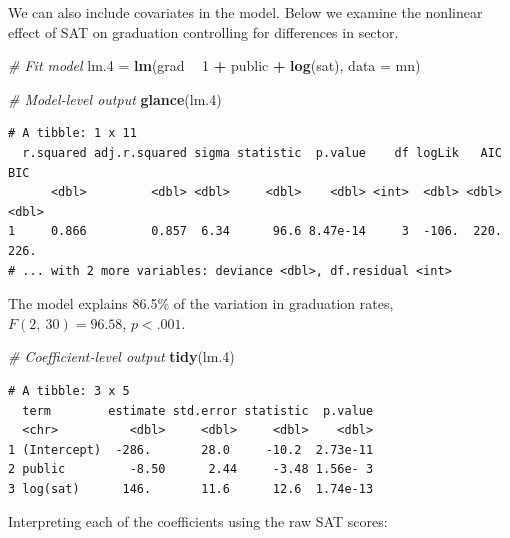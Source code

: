 \documentclass[]{book}
\newenvironment{Shaded}{\begin{snugshade}}{\end{snugshade}}
\newcommand{\CommentTok}[1]{\textcolor[rgb]{0.56,0.35,0.01}{\textit{#1}}}
\newcommand{\DataTypeTok}[1]{\textcolor[rgb]{0.13,0.29,0.53}{#1}}
\newcommand{\DecValTok}[1]{\textcolor[rgb]{0.00,0.00,0.81}{#1}}
\newcommand{\FloatTok}[1]{\textcolor[rgb]{0.00,0.00,0.81}{#1}}
\newcommand{\KeywordTok}[1]{\textcolor[rgb]{0.13,0.29,0.53}{\textbf{#1}}}
\newcommand{\NormalTok}[1]{#1}
\newcommand{\OperatorTok}[1]{\textcolor[rgb]{0.81,0.36,0.00}{\textbf{#1}}}
\newcommand{\StringTok}[1]{\textcolor[rgb]{0.31,0.60,0.02}{#1}}
\begin{document}
We can also include covariates in the model. Below we examine the nonlinear effect of SAT on graduation controlling for differences in sector.

\begin{Shaded}
\begin{Highlighting}[]
\CommentTok{# Fit model}
\NormalTok{lm}\FloatTok{.4}\NormalTok{ =}\StringTok{ }\KeywordTok{lm}\NormalTok{(grad }\OperatorTok{~}\StringTok{ }\DecValTok{1} \OperatorTok{+}\StringTok{ }\NormalTok{public }\OperatorTok{+}\StringTok{ }\KeywordTok{log}\NormalTok{(sat), }\DataTypeTok{data =}\NormalTok{ mn)}

\CommentTok{# Model-level output}
\KeywordTok{glance}\NormalTok{(lm}\FloatTok{.4}\NormalTok{)}
\end{Highlighting}
\end{Shaded}

\begin{verbatim}
# A tibble: 1 x 11
  r.squared adj.r.squared sigma statistic  p.value    df logLik   AIC   BIC
      <dbl>         <dbl> <dbl>     <dbl>    <dbl> <int>  <dbl> <dbl> <dbl>
1     0.866         0.857  6.34      96.6 8.47e-14     3  -106.  220.  226.
# ... with 2 more variables: deviance <dbl>, df.residual <int>
\end{verbatim}

The model explains 86.5\% of the variation in graduation rates, \(F(2,~30)=96.58\), \(p<.001\).

\begin{Shaded}
\begin{Highlighting}[]
\CommentTok{# Coefficient-level output}
\KeywordTok{tidy}\NormalTok{(lm}\FloatTok{.4}\NormalTok{)}
\end{Highlighting}
\end{Shaded}

\begin{verbatim}
# A tibble: 3 x 5
  term        estimate std.error statistic  p.value
  <chr>          <dbl>     <dbl>     <dbl>    <dbl>
1 (Intercept)  -286.       28.0     -10.2  2.73e-11
2 public         -8.50      2.44     -3.48 1.56e- 3
3 log(sat)      146.       11.6      12.6  1.74e-13
\end{verbatim}

Interpreting each of the coefficients using the raw SAT scores:
\end{document}
